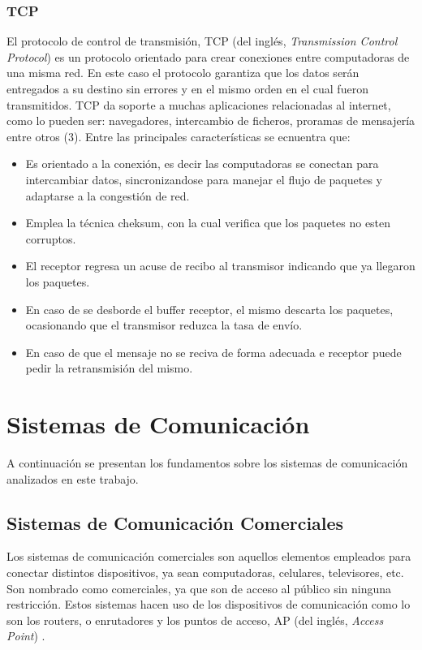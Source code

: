 \subsubsection{TCP}
El protocolo de control de transmisión, TCP (del inglés, \textit{Transmission Control Protocol}) es un protocolo orientado para crear conexiones entre computadoras de una misma red. En este caso el protocolo garantiza que los datos serán entregados a su destino sin errores y en el mismo orden en el cual fueron transmitidos. TCP da soporte a muchas aplicaciones relacionadas al internet, como lo pueden ser: navegadores, intercambio de ficheros, proramas de mensajería entre otros (3). Entre las principales características se ecnuentra que: 

\begin{itemize}
	\item Es orientado a la conexión, es decir las computadoras se conectan para intercambiar datos, sincronizandose para manejar el flujo de paquetes y adaptarse a la congestión de red.
	\item Emplea la técnica cheksum, con la cual verifica que los paquetes no esten corruptos.
	\item El receptor regresa un acuse de recibo al transmisor indicando que ya llegaron los paquetes.
	\item En caso de se desborde el buffer receptor, el mismo descarta los paquetes, ocasionando que el transmisor reduzca la tasa de envío.
	\item En caso de que el mensaje no se reciva de forma adecuada e receptor puede pedir la retransmisión del mismo.
\end{itemize}

\section{Sistemas de Comunicación}

A continuación se presentan los fundamentos sobre los sistemas de comunicación analizados en este trabajo.\\ 

\subsection{Sistemas de Comunicación Comerciales}
Los sistemas de comunicación comerciales son aquellos elementos empleados para conectar distintos dispositivos, ya sean computadoras, celulares, televisores, etc. Son nombrado como comerciales, ya que son de acceso al público sin ninguna restricción. Estos sistemas hacen uso de los dispositivos de comunicación como lo son los routers, o enrutadores y los puntos de acceso, AP (del inglés, \textit{Access Point}) \cite{pellejero2006fundamentos}.\\

